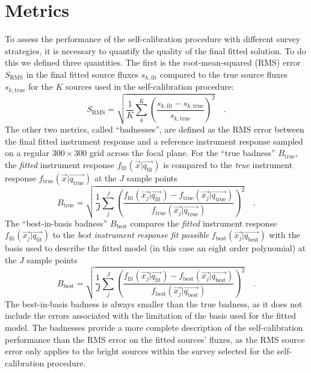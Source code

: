 \documentclass[manuscript]{aastex}
\newcommand{\true}{\text{true}}
\newcommand{\fit}{\text{fit}}
\newcommand{\basis}{\text{best}}
\begin{document}
\section{Metrics}
\label{sec:metrics}
To assess the performance of the self-calibration procedure with different survey strategies, it is necessary to quantify the quality of the final fitted solution. To do this we defined three quantities. The first is the root-mean-squared (RMS) error $S_\text{RMS}$ in the final fitted source fluxes $s_{k,\fit}$ compared to the true source fluxes $s_{k,\true}$ for the $K$ sources used in the self-calibration procedure:
\begin{equation}
S_\text{RMS} = \sqrt{\dfrac{1}{K} \sum_k^K \left( \dfrac{s_{k,\fit} - s_{k,\true}}{s_{k,\true}} \right)^2}   \quad .
\end{equation}
The other two metrics, called ``badnesses'', are defined as the RMS error between the final fitted instrument response and a reference instrument response sampled on a regular $300 \times 300$ grid across the focal plane. For the ``true badness'' $B_\true$, the \textit{fitted} instrument response $f_\fit(\vec{x} | \vec{q_\fit})$ is compared to the \textit{true} instrument response $f_\true(\vec{x} | \vec{q_\true})$ at the $J$ sample points  
\begin{equation}
B_\true = \sqrt{\dfrac{1}{J} \sum_j^J \left(\dfrac{f_\fit(\vec{x_j} | \vec{q_\fit}) - f_\true(\vec{x_j} | \vec{q_\true})}{f_\true(\vec{x_j} | \vec{q_\true})}\right)^2}   \quad .
\end{equation}
The ``best-in-basis badness'' $B_\basis$ compares the \textit{fitted} instrument response $f_\fit(\vec{x_j} | \vec{q_\fit})$ to the \textit{best instrument response fit possible} $f_\basis(\vec{x_j} | \vec{q_\basis})$ with the basis used to describe the fitted model (in this case an eight order polynomial) at the $J$ sample points
\begin{equation}
B_\basis = \sqrt{\dfrac{1}{J} \sum_j^J \left( \dfrac{f_\fit(\vec{x_j} | \vec{q_\fit}) - f_\basis(\vec{x_j} | \vec{q_\basis})}{f_\basis(\vec{x_j} | \vec{q_\basis})} \right)^2}   \quad .
\end{equation}
The best-in-basis badness is always smaller than the true badness, as it does not include the errors associated with the limitation of the basis used for the fitted model. The badnesses provide a more complete description of the self-calibration performance than the RMS error on the fitted sources' fluxes, as the RMS source error only applies to the bright sources within the survey selected for the self-calibration procedure.
\end{document}
